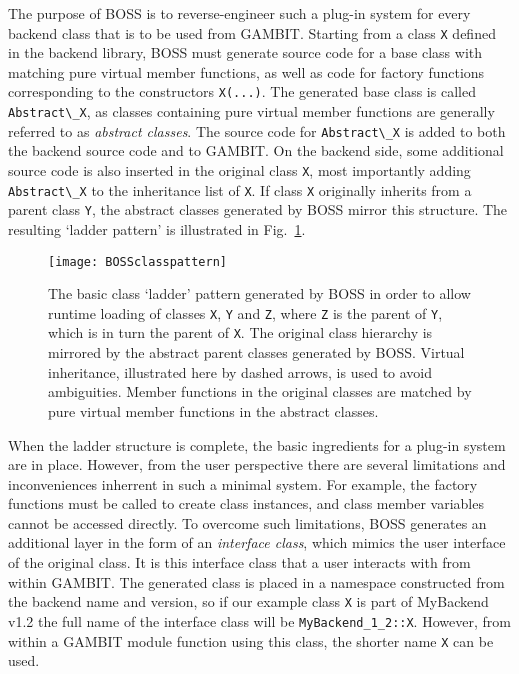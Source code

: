 \documentclass[pdftex,twocolumn,epjc3_preprint,runningheads]{svjour3}
\renewcommand{\_}{\discretionary{\underscore}{}{\underscore}}
\newcommand\cpp[1]{{\lstinline!#1!}}  %
\newcommand{\gambit}{\textsf{GAMBIT}\xspace}
\newcommand{\BOSS}{\textsf{BOSS}\xspace}
\newcommand{\GB}{\gambit}
\begin{document}
The purpose of \BOSS is to reverse-engineer such a plug-in system for every backend class that is to be used from \GB. Starting from a class \cpp{X} defined in the backend library, \BOSS must generate source code for a base class with matching pure virtual member functions, as well as code for factory functions corresponding to the constructors \cpp{X(...)}. The generated base class is called \mbox{\cpp{Abstract\_X},} as classes containing pure virtual member functions are generally referred to as {\it abstract classes}. The source code for \cpp{Abstract\_X} is added to both the backend source code and to \GB. On the backend side, some additional source code is also inserted in the original class \mbox{\cpp{X},} most importantly adding \cpp{Abstract\_X} to the inheritance list of \cpp{X}. If class \cpp{X} originally inherits from a parent class \cpp{Y}, the abstract classes generated by \BOSS mirror this structure.  The resulting `ladder pattern' is illustrated in Fig.\ \ref{fig::boss_class_pattern}.

\begin{figure}%
\centering
\texttt{[image: BOSS\_class\_pattern]}
\caption{The basic class `ladder' pattern generated by \BOSS in order to allow runtime loading of classes \cpp{X}, \cpp{Y} and \cpp{Z}, where \cpp{Z} is the parent of \cpp{Y}, which is in turn the parent of \cpp{X}. The original class hierarchy is mirrored by the abstract parent classes generated by \BOSS. Virtual inheritance, illustrated here by dashed arrows, is used to avoid ambiguities. Member functions in the original classes are matched by pure virtual member functions in the abstract classes.}
\label{fig::boss_class_pattern}
\end{figure}

When the ladder structure is complete, the basic ingredients for a plug-in system are in place. However, from the user perspective there are several limitations and inconveniences inherrent in such a minimal system. For example, the factory functions must be called to create class instances, and class member variables cannot be accessed directly.  To overcome such limitations, \BOSS generates an additional layer in the form of an \textit{interface class}, which mimics the user interface of the original class. It is this interface class that a user interacts with from within \GB. The generated class is placed in a namespace constructed from the backend name and version, so if our example class \cpp{X} is part of \textsf{MyBackend} v1.2 the full name of the interface class will be \cpp{MyBackend_1_2::X}. However, from within a \GB module function using this class, the shorter name \cpp{X} can be used.
\end{document}
